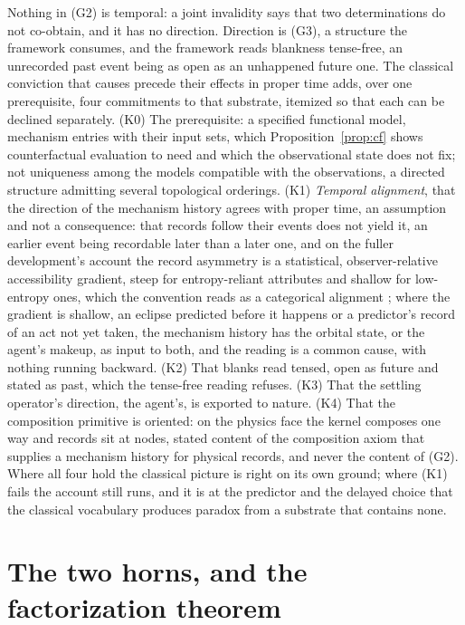 \documentclass[11pt]{article}
\begin{document}
Nothing in (G2) is temporal: a joint invalidity says that two determinations do not co-obtain, and it has no direction. Direction is (G3), a structure the framework consumes, and the framework reads blankness tense-free, an unrecorded past event being as open as an unhappened future one. The classical conviction that causes precede their effects in proper time adds, over one prerequisite, four commitments to that substrate, itemized so that each can be declined separately. (K0) The prerequisite: a specified functional model, mechanism entries with their input sets, which Proposition~\ref{prop:cf} shows counterfactual evaluation to need and which the observational state does not fix; not uniqueness among the models compatible with the observations, a directed structure admitting several topological orderings. (K1) \emph{Temporal alignment}, that the direction of the mechanism history agrees with proper time, an assumption and not a consequence: that records follow their events does not yield it, an earlier event being recordable later than a later one, and on the fuller development's account the record asymmetry is a statistical, observer-relative accessibility gradient, steep for entropy-reliant attributes and shallow for low-entropy ones, which the convention reads as a categorical alignment \cite{Aethus}; where the gradient is shallow, an eclipse predicted before it happens or a predictor's record of an act not yet taken, the mechanism history has the orbital state, or the agent's makeup, as input to both, and the reading is a common cause, with nothing running backward. (K2) That blanks read tensed, open as future and stated as past, which the tense-free reading refuses. (K3) That the settling operator's direction, the agent's, is exported to nature. (K4) That the composition primitive is oriented: on the physics face the kernel composes one way and records sit at nodes, stated content of the composition axiom that supplies a mechanism history for physical records, and never the content of (G2). Where all four hold the classical picture is right on its own ground; where (K1) fails the account still runs, and it is at the predictor and the delayed choice that the classical vocabulary produces paradox from a substrate that contains none.

\section{The two horns, and the factorization theorem}
\label{sec:theorem}
\end{document}
